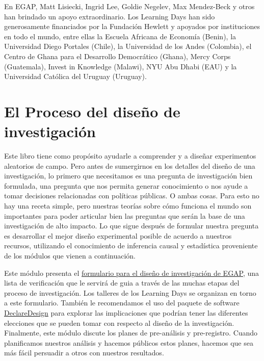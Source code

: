 \documentclass[12pt,spanish,]{book}
\begin{document}
En EGAP, Matt Lisiecki, Ingrid Lee, Goldie Negelev, Max Mendez-Beck y otros han brindado un apoyo extraordinario. Los Learning Days han sido generosamente financiados por la Fundación Hewlett y apoyados por instituciones en todo el mundo, entre ellas la Escuela Africana de Economía (Benin), la Universidad Diego Portales (Chile), la Universidad de los Andes (Colombia), el Centro de Ghana para el Desarrollo Democrático (Ghana), Mercy Corps (Guatemala), Invest in Knowledge (Malawi), NYU Abu Dhabi (EAU) y la Universidad Católica del Uruguay (Uruguay).

\hypertarget{el-proceso-del-diseuxf1o-de-investigaciuxf3n}{%
\chapter{El Proceso del diseño de investigación}\label{el-proceso-del-diseuxf1o-de-investigaciuxf3n}}

Este libro tiene como propósito ayudarle a comprender y a diseñar experimentos aleatorios de campo. Pero antes de sumergirnos en los detalles del diseño de una investigación, lo primero que necesitamos es una pregunta de investigación bien formulada, una pregunta que nos permita generar conocimiento o nos ayude a tomar decisiones relacionadas con políticas públicas. O ambas cosas. Para esto no hay una receta simple, pero nuestras teorías sobre cómo funciona el mundo son importantes para poder articular bien las preguntas que serán la base de una investigación de alto impacto. Lo que sigue después de formular nuestra pregunta es desarrollar el mejor diseño experimental posible de acuerdo a nuestros recursos, utilizando el conocimiento de inferencia causal y estadística proveniente de los módulos que vienen a continuación.

Este módulo presenta el \href{https://egap.github.io/learningdays-resources/Exercises/design-form.Rmd}{formulario para el diseño de investigación de EGAP}, una lista de verificación que le servirá de guia a través de las muchas etapas del proceso de investigación. Los talleres de los Learning Days se organizan en torno a este formulario. También le recomendamos el uso del paquete de software \href{http://declaredesign.org}{DeclareDesign} para explorar las implicaciones que podrían tener las diferentes elecciones que se pueden tomar con respecto al diseño de la investigación. Finalmente, este módulo discute los planes de pre-análisis y pre-registro. Cuando planificamos nuestros análisis y hacemos públicos estos planes, hacemos que sea más fácil persuadir a otros con nuestros resultados.
\end{document}
